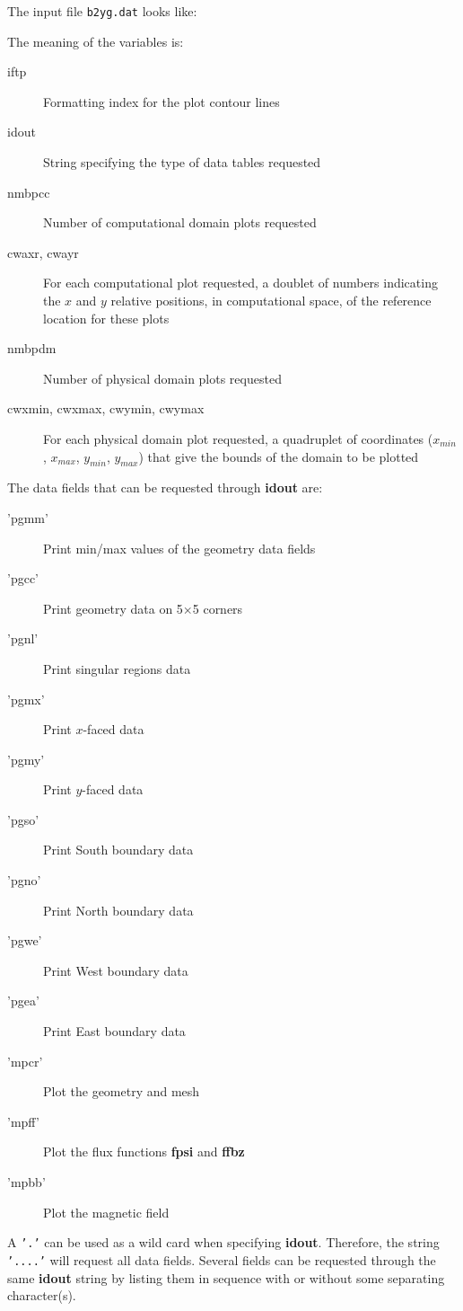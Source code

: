 \documentclass[a4paper,10pt]{report}
\begin{document}
The input file {\tt b2yg.dat} looks like:

The meaning of the variables is:
\begin{description}
  \item[iftp] Formatting index for the plot contour lines
  \item[idout] String specifying the type of data tables requested
  \item[nmbpcc] Number of computational domain plots requested
  \item[cwaxr, cwayr] For each computational plot requested, a doublet of numbers
indicating the $x$ and $y$ relative positions, in computational space, of the reference
location for these plots
  \item[nmbpdm] Number of physical domain plots requested
  \item[cwxmin, cwxmax, cwymin, cwymax] For each physical domain plot requested, a
quadruplet of coordinates ($x_{min}$, $x_{max}$, $y_{min}$, $y_{max}$) that give
the bounds of the domain to be plotted
\end{description}

The data fields that can be requested through {\bf idout} are:
\begin{description}
  \item['pgmm'] Print min/max values of the geometry data fields
  \item['pgcc'] Print geometry data on 5$\times$5 corners
  \item['pgnl'] Print singular regions data
  \item['pgmx'] Print $x$-faced data
  \item['pgmy'] Print $y$-faced data
  \item['pgso'] Print South boundary data
  \item['pgno'] Print North boundary data
  \item['pgwe'] Print West boundary data
  \item['pgea'] Print East boundary data
  \item['mpcr'] Plot the geometry and mesh
  \item['mpff'] Plot the flux functions {\bf fpsi} and {\bf ffbz}
  \item['mpbb'] Plot the magnetic field
\end{description}
A {\tt '.'} can be used as a wild card when specifying {\bf idout}.
Therefore, the string {\tt '....'} will request all data fields.
Several fields can be requested through the same {\bf idout} string by listing them
in sequence with or without some separating character(s).
\end{document}
